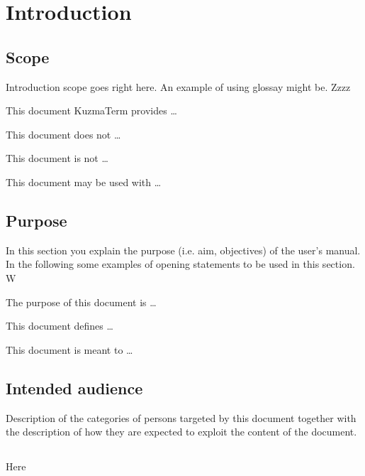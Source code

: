 \chapter{Introduction}
\label{chap:introduction}


\section{Scope}
Introduction scope goes right here. An example of using glossay might be. Zzzz 


This document \gls{KuzmaTerm}  provides \ldots


This document does not \ldots 
 
This document is not \ldots

 
This document may be used with \ldots




\section{Purpose}
In this section you explain the purpose (i.e. aim, objectives) of the user's
manual. In the following some examples of opening statements to be used in this
section. W  

The purpose of this document is \ldots

This document defines \ldots

This document is meant to \ldots



\section{Intended audience}
Description of the categories of persons targeted by this document together with the description of how they are expected to exploit the content of the document.


\section{\mysystemname}
Here 
  
